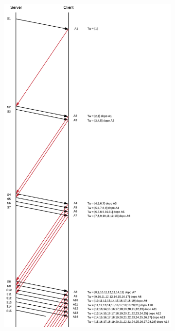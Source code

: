 \documentclass[10pt,a4paper]{article}
\begin{document}
\begin{enumerate}
\begin{itemize}
			\end{itemize}
			\newpage
			\begin{figure}[H]
				\begin{subfigure}[b]{9cm}
				  \includegraphics[width=\textwidth]{Esame812019_Conperdite1}
				\end{subfigure}

\end{figure}
\end{enumerate}
\end{document}

